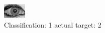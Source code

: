 \begin{figure}[h!]
\begin{center}
\includegraphics[width=0.60\columnwidth]{figures/ID1997_class_1_target_2.png}
\end{center}
\caption{ Classification: 1 actual target: 2}
\label{fig:ID1997_class_1_target_2}
\end{figure}

